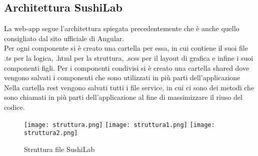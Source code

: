 \subsection{Architettura SushiLab}
La web-app segue l'architettura spiegata precedentemente che è anche quello consigliato dal sito ufficiale di Angular.\\
Per ogni componente si è creato una cartella per essa, in cui contiene il suoi file .ts per la logica, .html per la struttura, .scss per il layout di grafica e infine i suoi componenti figli. Per i componenti condivisi si è creato una cartella shared dove vengono salvati i componenti che sono utilizzati in più parti dell'applicazione\\
Nella cartella rest vengono salvati tutti i file service, in cui ci sono dei metodi che sono chiamati in più parti dell'applicazione al fine di massimizzare il riuso del codice.\\
\begin{figure}[H]
    \centering
    \texttt{[image: struttura.png]}
    \texttt{[image: struttura1.png]}
    \texttt{[image: struttura2.png]}
    \caption{Struttura file SushiLab}
\end{figure}
